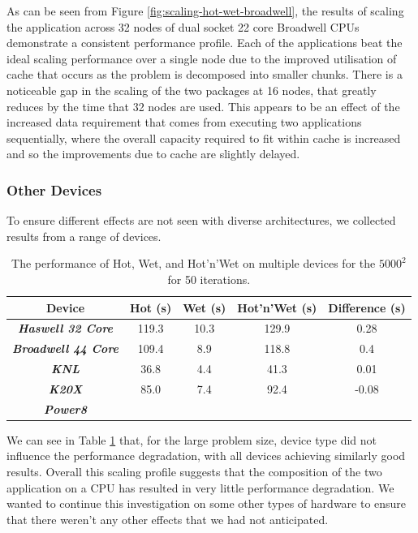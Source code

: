 \documentclass[runningheads,a4paper]{llncs}
\begin{document}
As can be seen from Figure \ref{fig:scaling-hot-wet-broadwell}, the results of scaling the application across 32 nodes of dual socket 22 core Broadwell CPUs demonstrate a consistent performance profile. Each of the applications beat the ideal scaling performance over a single node due to the improved utilisation of cache that occurs as the problem is decomposed into smaller chunks. There is a noticeable gap in the scaling of the two packages at 16 nodes, that greatly reduces by the time that 32 nodes are used. This appears to be an effect of the increased data requirement that comes from executing two applications sequentially, where the overall capacity required to fit within cache is increased and so the improvements due to cache are slightly delayed.

\subsubsection{Other Devices}

To ensure different effects are not seen with diverse architectures, we collected results from a range of devices.

\begin{table}[h]
  \begin{center}
    \begin{tabular}{ccccc}
      \hline
      \textbf{Device} & \textbf{Hot (s)} & \textbf{Wet (s)} & \textbf{Hot'n'Wet (s)} & \textbf{Difference (s)} \\
      \hline
      \textit{\textbf{Haswell 32 Core}} & 119.3 & 10.3 & 129.9 & 0.28\\
      \textit{\textbf{Broadwell 44 Core}} & 109.4 & 8.9 & 118.8 & 0.4\\
      \textit{\textbf{KNL}} & 36.8 & 4.4 & 41.3 & 0.01 \\
      \textit{\textbf{K20X}} & 85.0 & 7.4 & 92.4 & -0.08 \\
      \textit{\textbf{Power8}} & & & & \\
    \end{tabular}
  \end{center}
  \caption{The performance of Hot, Wet, and Hot'n'Wet on multiple devices for the $5000^2$ for 50 iterations.}
  \label{tab:hot-wet-multi-device}
\end{table}

We can see in Table \ref{tab:hot-wet-multi-device} that, for the large problem size, device type did not influence the performance degradation, with all devices achieving similarly good results. Overall this scaling profile suggests that the composition of the two application on a CPU has resulted in very little performance degradation. We wanted to continue this investigation on some other types of hardware to ensure that there weren't any other effects that we had not anticipated.
\end{document}
